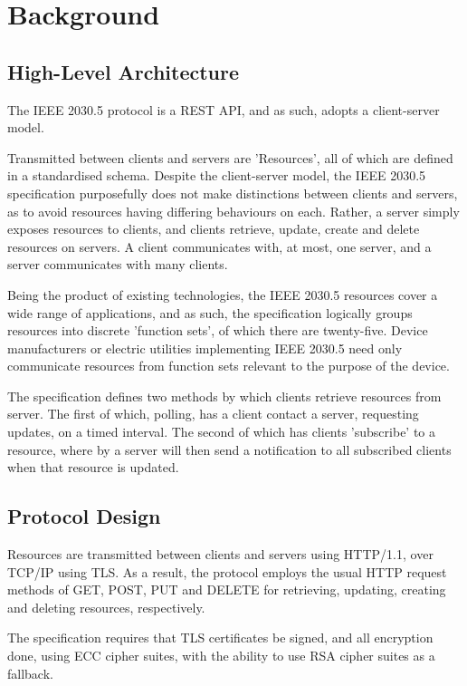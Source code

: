 \chapter{Background}\label{ch:background}

\section{High-Level Architecture}
The IEEE 2030.5 protocol is a REST API, and as such, adopts a client-server model.

Transmitted between clients and servers are 'Resources', all of which are defined in a standardised schema. 
Despite the client-server model, the IEEE 2030.5 specification purposefully does not make distinctions between clients and servers, as to avoid resources having differing behaviours on each. Rather, a server simply exposes resources to clients, and clients retrieve, update, create and delete resources on servers.
A client communicates with, at most, one server, and a server communicates with many clients.

Being the product of existing technologies, the IEEE 2030.5 resources cover a wide range of applications, and as such, the specification logically groups resources into discrete 'function sets', of which there are twenty-five. 
Device manufacturers or electric utilities implementing IEEE 2030.5 need only communicate resources from function sets relevant to the purpose of the device. 

The specification defines two methods by which clients retrieve resources from server. The first of which, polling, has a client contact a server, requesting updates, on a timed interval. 
The second of which has clients 'subscribe' to a resource, where by a server will then send a notification to all subscribed clients when that resource is updated.
\cite{IEEE2030.5}

\section{Protocol Design}
Resources are transmitted between clients and servers using HTTP/1.1, over TCP/IP using TLS.
As a result, the protocol employs the usual HTTP request methods of GET, POST, PUT and DELETE for retrieving, updating, creating and deleting resources, respectively.

The specification requires that TLS certificates be signed, and all encryption done, using ECC cipher suites, with the ability to use RSA cipher suites as a fallback.

